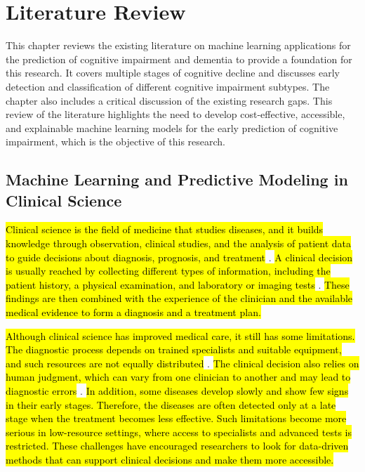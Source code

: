 \chapter{Literature Review}
\hspace{12.7mm}This chapter reviews the existing literature on machine learning applications for the prediction of cognitive impairment and dementia to provide a foundation for this research. It covers multiple stages of cognitive decline and discusses early detection and classification of different cognitive impairment subtypes. The chapter also includes a critical discussion of the existing research gaps. This review of the literature highlights the need to develop cost-effective, accessible, and explainable machine learning models for the early prediction of cognitive impairment, which is the objective of this research.

\section{Machine Learning and Predictive Modeling in Clinical Science}
\hl{Clinical science is the field of medicine that studies diseases, and it builds knowledge through observation, clinical studies, and the analysis of patient data to guide decisions about diagnosis, prognosis, and treatment} \cite{Sackett1996Evidence}. \hl{A clinical decision is usually reached by collecting different types of information, including the patient history, a physical examination, and laboratory or imaging tests} \cite{Ng2025Clinical}. \hl{These findings are then combined with the experience of the clinician and the available medical evidence to form a diagnosis and a treatment plan.}

\hl{Although clinical science has improved medical care, it still has some limitations. The diagnostic process depends on trained specialists and suitable equipment, and such resources are not equally distributed} \cite{Kwaku2023Prioritising}. \hl{The clinical decision also relies on human judgment, which can vary from one clinician to another and may lead to diagnostic errors} \cite{NewmanToker2024Burden}. \hl{In addition, some diseases develop slowly and show few signs in their early stages. Therefore, the diseases are often detected only at a late stage when the treatment becomes less effective. Such limitations become more serious in low-resource settings, where access to specialists and advanced tests is restricted. These challenges have encouraged researchers to look for data-driven methods that can support clinical decisions and make them more accessible.}

